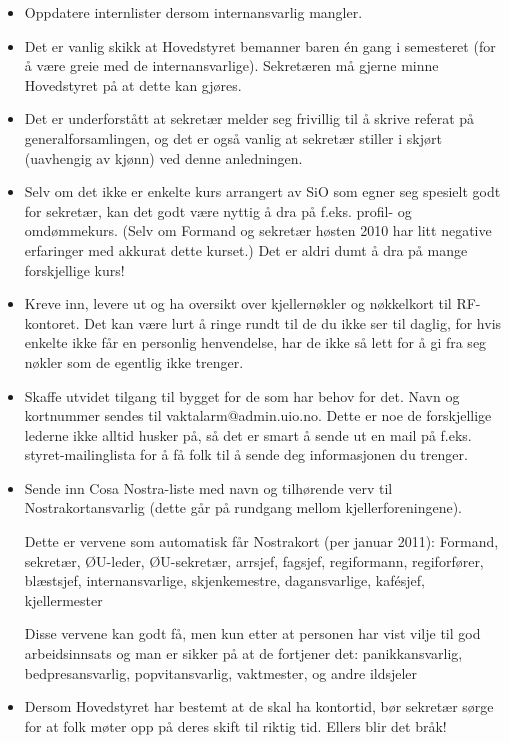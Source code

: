 \begin{itemize}
    \item Oppdatere internlister dersom internansvarlig mangler.

    \item Det er vanlig skikk at Hovedstyret bemanner baren én gang i semesteret
        (for å være greie med de internansvarlige). Sekretæren må gjerne minne
        Hovedstyret på at dette kan gjøres.

    \item Det er underforstått at sekretær melder seg frivillig til å skrive
        referat på generalforsamlingen, og det er også vanlig at sekretær
        stiller i skjørt (uavhengig av kjønn) ved denne anledningen.

    \item Selv om det ikke er enkelte kurs arrangert av SiO som egner seg
        spesielt godt for sekretær, kan det godt være nyttig å dra på f.eks.
        profil- og omdømmekurs. (Selv om Formand og sekretær høsten 2010 har
        litt negative erfaringer med akkurat dette kurset.) Det er aldri dumt å
        dra på mange forskjellige kurs!

    \item Kreve inn, levere ut og ha oversikt over kjellernøkler og nøkkelkort
        til RF-kontoret. Det kan være lurt å ringe rundt til de du ikke ser til
        daglig, for hvis enkelte ikke får en personlig henvendelse, har de ikke
        så lett for å gi fra seg nøkler som de egentlig ikke trenger.

    \item Skaffe utvidet tilgang til bygget for de som har behov for det. Navn
        og kortnummer sendes til vaktalarm@admin.uio.no. Dette er noe de
        forskjellige lederne ikke alltid husker på, så det er smart å sende ut
        en mail på f.eks.  styret-mailinglista for å få folk til å sende deg
        informasjonen du trenger.

    \item Sende inn Cosa Nostra-liste med navn og tilhørende verv til
        Nostrakortansvarlig (dette går på rundgang mellom kjellerforeningene). 

        \subitem Dette er vervene som automatisk får Nostrakort (per januar
            2011): Formand, sekretær, ØU-leder, ØU-sekretær, arrsjef, fagsjef,
            regiformann, regiforfører, blæstsjef, internansvarlige,
            skjenkemestre, dagansvarlige, kafésjef, kjellermester

        \subitem Disse vervene kan godt få, men kun etter at personen har vist
            vilje til god arbeidsinnsats og man er sikker på at de fortjener
            det: panikkansvarlig, bedpresansvarlig, popvitansvarlig, vaktmester,
            og andre ildsjeler

    \item Dersom Hovedstyret har bestemt at de skal ha kontortid, bør sekretær
        sørge for at folk møter opp på deres skift til riktig tid. Ellers blir
        det bråk!  
\end{itemize}

